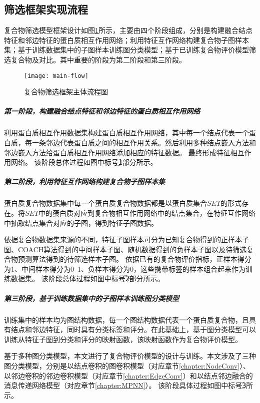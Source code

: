 \subsection{筛选框架实现流程}
\label{subsection:motivationAndThinking:flow}

复合物筛选模型框架设计如图\ref{fig:main-flow}所示，主要由四个阶段组成，分别是构建融合结点特征和邻边特征的蛋白质相互作用网络；利用特征互作网络构建复合物子图样本集；基于训练数据集中的子图样本训练图分类模型；基于已训练复合物评价模型筛选复合物及对比。其中重要的阶段为第二阶段和第三阶段。

\begin{figure}[htbp]
  \centering
  \texttt{[image: main-flow]}
  \caption{复合物筛选框架主体流程图}
  \label{fig:main-flow}
\end{figure}

\subparagraph*{第一阶段，构建融合结点特征和邻边特征的蛋白质相互作用网络}

利用蛋白质相互作用数据集构建蛋白质相互作用网络，其中每一个结点代表一个蛋白质，每一条邻边代表蛋白质之间的相互作用关系。然后利用多种结点嵌入方法和邻边嵌入方法给蛋白质相互作用网络添加相应的特征数据。
最终形成特征相互作用网络。
该阶段总体过程如图中标号\textcircled{1}部分所示。

\subparagraph*{第二阶段，利用特征互作网络构建复合物子图样本集}

蛋白质复合物数据集中每一个蛋白质复合物数据都是以蛋白质集合$SET$的形式存在。将$SET$中的蛋白质对应到复合物相互作用网络中的结点集合，在特征互作网络中抽取结点集合对应的子图，得到特征子图数据。

依据复合物数据集来源的不同，特征子图样本可分为已知复合物得到的正样本子图、COACH算法得到的中间样本子图、随机数据得到的负样本子图以及待筛选复合物预测算法得到的待筛选样本子图。
依据已有的复合物评价指标，正样本得分为1、中间样本得分为0~1、负样本得分为0，这些携带标签的样本组合起来作为训练数据集。
该阶段总体过程如图中标号\textcircled{2}部分所示。

\subparagraph*{第三阶段，基于训练数据集中的子图样本训练图分类模型}

训练集中的样本均为图结构数据，每一个图结构数据代表一个蛋白质复合物，且具有结点和邻边特征，同时具有分类标签和评分。在此基础上，基于图分类模型可以训练从特征子图到分类和评分的映射函数，该映射函数作为复合物评价模型。

基于多种图分类模型，本文进行了复合物评价模型的设计与训练。本文涉及了三种图分类模型，分别是以结点卷积的图卷积模型（对应章节\ref{chapter:NodeConv}）、以邻边卷积的邻边卷积模型（对应章节\ref{chapter:EdgeConv}）和以结点邻边融合的消息传递网络模型（对应章节\ref{chapter:MPNN}）。
该阶段具体过程如图中标号\textcircled{3}所示。


